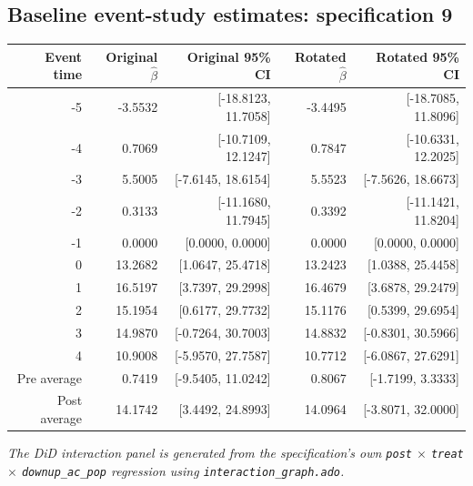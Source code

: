 \documentclass[10pt]{article}
\begin{document}
\subsection*{Baseline event-study estimates: specification 9}
\begin{center}
\scriptsize
\begin{tabular}{r rr rr}
\toprule
Event time & Original $\hat\beta$ & Original 95\% CI & Rotated $\hat\beta$ & Rotated 95\% CI \\
\midrule
-5 & -3.5532 & [-18.8123, 11.7058] & -3.4495 & [-18.7085, 11.8096] \\
-4 & 0.7069 & [-10.7109, 12.1247] & 0.7847 & [-10.6331, 12.2025] \\
-3 & 5.5005 & [-7.6145, 18.6154] & 5.5523 & [-7.5626, 18.6673] \\
-2 & 0.3133 & [-11.1680, 11.7945] & 0.3392 & [-11.1421, 11.8204] \\
-1 & 0.0000 & [0.0000, 0.0000] & 0.0000 & [0.0000, 0.0000] \\
0 & 13.2682 & [1.0647, 25.4718] & 13.2423 & [1.0388, 25.4458] \\
1 & 16.5197 & [3.7397, 29.2998] & 16.4679 & [3.6878, 29.2479] \\
2 & 15.1954 & [0.6177, 29.7732] & 15.1176 & [0.5399, 29.6954] \\
3 & 14.9870 & [-0.7264, 30.7003] & 14.8832 & [-0.8301, 30.5966] \\
4 & 10.9008 & [-5.9570, 27.7587] & 10.7712 & [-6.0867, 27.6291] \\
\midrule
Pre average & 0.7419 & [-9.5405, 11.0242] & 0.8067 & [-1.7199, 3.3333] \\
Post average & 14.1742 & [3.4492, 24.8993] & 14.0964 & [-3.8071, 32.0000] \\
\bottomrule
\end{tabular}
\end{center}
\medskip
\textit{The DiD interaction panel is generated from the specification's own \texttt{post} $\times$ \texttt{treat} $\times$ \texttt{downup\_ac\_pop} regression using \texttt{interaction\_graph.ado}.}
\clearpage
\end{document}
